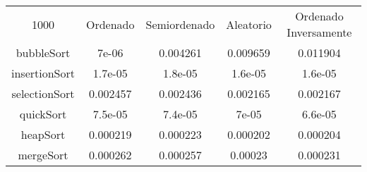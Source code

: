 \begin{longtable}{c | c | c | c | c}
1000 & Ordenado & Semiordenado & Aleatorio & Ordenado Inversamente \\
bubbleSort & 7e-06 & 0.004261 & 0.009659 & 0.011904 \\
insertionSort & 1.7e-05 & 1.8e-05 & 1.6e-05 & 1.6e-05 \\
selectionSort & 0.002457 & 0.002436 & 0.002165 & 0.002167 \\
quickSort & 7.5e-05 & 7.4e-05 & 7e-05 & 6.6e-05 \\
heapSort & 0.000219 & 0.000223 & 0.000202 & 0.000204 \\
mergeSort & 0.000262 & 0.000257 & 0.00023 & 0.000231 \\
\end{longtable}